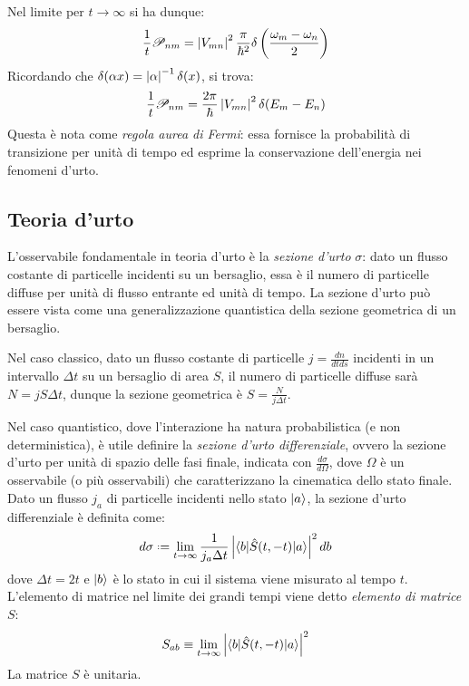 Nel limite per $ t \rightarrow \infty $ si ha dunque:
\begin{equation*}
	\frac{1}{t} \mathscr{P}_{nm} = \left\lvert V_{mn}\right\rvert^2 \frac{\pi}{\hbar^2} \delta \left( \frac{\omega_m - \omega_n}{2} \right)
\end{equation*}
Ricordando che $ \delta(\alpha x) = \left\lvert\alpha\right\rvert^{-1} \delta(x) $, si trova:
\begin{equation}
	\frac{1}{t} \mathscr{P}_{nm} = \frac{2\pi}{\hbar} \left\lvert V_{mn}\right\rvert^2 \delta(E_m - E_n)
	\label{eq:5.25}
\end{equation}
Questa è nota come \textit{regola aurea di Fermi}: essa fornisce la probabilità di transizione per unità di tempo ed esprime la conservazione dell'energia nei fenomeni d'urto.

\subsection{Teoria d'urto}

L'osservabile fondamentale in teoria d'urto è la \textit{sezione d'urto} $ \sigma $: dato un flusso costante di particelle incidenti su un bersaglio, essa è il numero di particelle diffuse per unità di flusso entrante ed unità di tempo. La sezione d'urto può essere vista come una generalizzazione quantistica della sezione geometrica di un bersaglio.

\begin{example}
	Nel caso classico, dato un flusso costante di particelle $ j = \frac{dn}{dt ds} $ incidenti in un intervallo $ \Delta t $ su un bersaglio di area $ S $, il numero di particelle diffuse sarà $ N = j S \Delta t $, dunque la sezione geometrica è $ S = \frac{N}{j \Delta t} $.
\end{example}

Nel caso quantistico, dove l'interazione ha natura probabilistica (e non deterministica), è utile definire la \textit{sezione d'urto differenziale}, ovvero la sezione d'urto per unità di spazio delle fasi finale, indicata con $ \frac{d \sigma}{d \Omega} $, dove $ \Omega $ è un osservabile (o più osservabili) che caratterizzano la cinematica dello stato finale.
Dato un flusso $ j_a $ di particelle incidenti nello stato $ \ket{a} $, la sezione d'urto differenziale è definita come:
\begin{equation}
	d \sigma \defeq \lim_{t \rightarrow \infty} \frac{1}{j_a \Delta t} \abs{\braket{b | \hat{S}(t,-t) | a}}^2 db
	\label{eq:5.26}
\end{equation}
dove $ \Delta t = 2t $ e $ \ket{b} $ è lo stato in cui il sistema viene misurato al tempo $ t $. L'elemento di matrice nel limite dei grandi tempi viene detto \textit{elemento di matrice} $ S $:
\begin{equation}
	S_{ab} \equiv \lim_{t \rightarrow \infty} \left\lvert\braket{b | \hat{S}(t,-t) | a}\right\rvert^2
	\label{eq:5.27}
\end{equation}
La matrice $ S $ è unitaria.

